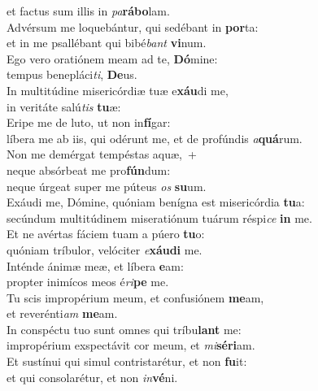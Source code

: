 \evenverse et factus sum illis in \textit{pa}\textbf{rá}\textbf{bo}lam.\\
\oddverse Advérsum me loquebántur, qui sedébant in \textbf{por}ta:~\*\\
\oddverse et in me psallébant qui bibé\textit{bant} \textbf{vi}num.\\
\evenverse Ego vero oratiónem meam ad te, \textbf{Dó}mine:~\*\\
\evenverse tempus benepláci\textit{ti}, \textbf{De}us.\\
\oddverse In multitúdine misericórdiæ tuæ e\textbf{xáu}di me,~\*\\
\oddverse in veritáte salú\textit{tis} \textbf{tu}æ:\\
\evenverse Eripe me de luto, ut non in\textbf{fí}gar:~\*\\
\evenverse líbera me ab iis, qui odérunt me, et de profúndis \textit{a}\textbf{quá}rum.\\
\oddverse Non me demérgat tempéstas aquæ,~+\\
\oddverse  neque absórbeat me pro\textbf{fún}dum:~\*\\
\oddverse neque úrgeat super me púteus \textit{os} \textbf{su}um.\\
\evenverse Exáudi me, Dómine, quóniam benígna est misericórdia \textbf{tu}a:~\*\\
\evenverse secúndum multitúdinem miseratiónum tuárum réspi\textit{ce} \textbf{in} me.\\
\oddverse Et ne avértas fáciem tuam a púero \textbf{tu}o:~\*\\
\oddverse quóniam tríbulor, velóciter \textit{e}\textbf{xáu}\textbf{di} me.\\
\evenverse Inténde ánimæ meæ, et líbera \textbf{e}am:~\*\\
\evenverse propter inimícos meos é\textit{ri}\textbf{pe} me.\\
\oddverse Tu scis impropérium meum, et confusiónem \textbf{me}am,~\*\\
\oddverse et reverénti\textit{am} \textbf{me}am.\\
\evenverse In conspéctu tuo sunt omnes qui tríbu\textbf{lant} me:~\*\\
\evenverse impropérium exspectávit cor meum, et \textit{mi}\textbf{sé}\textbf{ri}am.\\
\oddverse Et sustínui qui simul contristarétur, et non \textbf{fu}it:~\*\\
\oddverse et qui consolarétur, et non \textit{in}\textbf{vé}ni.\\
